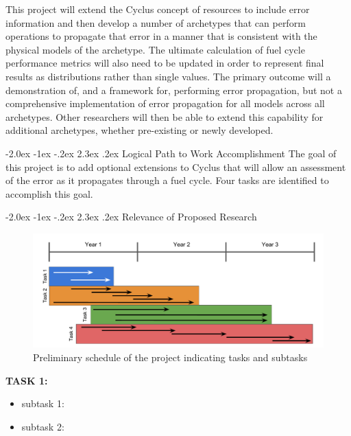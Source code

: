 \documentclass[dvips,11pt]{article}
\makeatletter
\renewcommand\section{\@startsection {section}{1}{\z@}%
                                   {-2.0ex \@plus -1ex \@minus -.2ex}%
                                   {2.3ex \@plus.2ex}%
                                   {\normalfont\bfseries}}%
\makeatother
\begin{document}
This project will extend the Cyclus concept of resources to include error
information and then develop a number of archetypes that can perform operations
to propagate that error in a manner that is consistent with the physical models
of the archetype.  The ultimate calculation of fuel cycle performance metrics
will also need to be updated in order to represent final results as
distributions rather than single values.  The primary outcome will a
demonstration of, and a framework for, performing error propagation, but not a
comprehensive implementation of error propagation for all models across all
archetypes.  Other researchers will then be able to extend this capability for
additional archetypes, whether pre-existing or newly developed.

\section{Logical Path to Work Accomplishment}
The goal of this project is to add optional extensions to Cyclus that will allow
an assessment of the error as it propagates through a fuel cycle.  Four tasks
are identified to accomplish this goal.




\section{Relevance of Proposed Research}


\begin{figure}[h!]
\centering
\includegraphics[width=\textwidth]	{timeline}
\caption{Preliminary schedule of the project indicating tasks and subtasks}
\label{fig:progression}
\end{figure}

\newpage
\noindent\textbf{TASK 1:}
\begin{itemize}[nosep]
\item subtask 1: 
\item subtask 2: 
\end{itemize}
\end{document}
